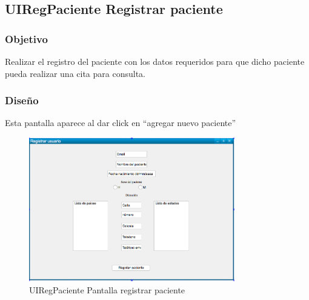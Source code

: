\subsection{UIRegPaciente Registrar paciente}

\subsubsection{Objetivo}
    Realizar el registro del paciente con los datos requeridos para que dicho paciente pueda realizar una cita para consulta. 

\subsubsection{Diseño}
    Esta pantalla aparece al dar click en ``agregar nuevo paciente''

\begin{figure}[htbp!]
        \centering
            \includegraphics[width=0.8\textwidth]{images/UIRegPaciente}
        \caption{UIRegPaciente Pantalla registrar paciente}
    \end{figure}


